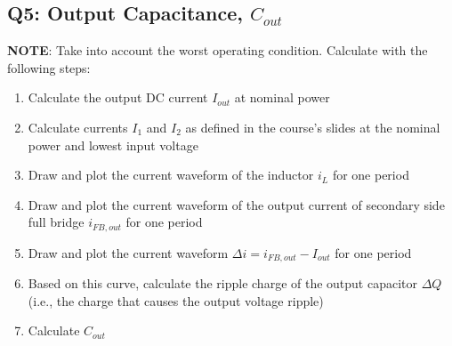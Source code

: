 \documentclass{PELsmallreport}
\begin{document}
      \quad {} \quad {}
    \hfill{}  

\subsection{Q5: Output Capacitance, $C_{out}$}
\label{sec:Q5}
\textbf{NOTE}: Take into account the worst operating condition. Calculate with the following steps:\\

\begin{enumerate}
        \item Calculate the output DC current $I_{out}$ at nominal power
        \item Calculate currents $I_1$ and $I_2$ as defined in the course's slides at the nominal power and lowest input voltage
        \item Draw and plot the current waveform of the inductor $i_L$ for one period
        \item Draw and plot the current waveform of the output current of secondary side full bridge $i_{FB,out}$ for one period
        \item Draw and plot the current waveform $\Delta i = i_{FB,out} - I_{out}$ for one period
        \item Based on this curve, calculate the ripple charge of the output capacitor $\Delta Q$ (i.e., the charge that causes the output voltage ripple)
        \item Calculate $C_{out}$
    \end{enumerate}
\end{document}
